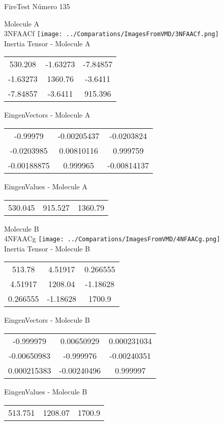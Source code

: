 \vtab[-2cm]
\begin{center}
{\large FireTest \tab Número 135}
\end{center}
\begin{multicols}{2}
\begin{center}

Molecule A \\ 
3NFAACf
\texttt{[image: ../Comparations/ImagesFromVMD/3NFAACf.png]}
\\
Inertia Tensor - Molecule A \\
\vtab

\begin{tabular}{|c c c|}
530.208	 & 	-1.63273	 & 	-7.84857	 \\
-1.63273	 & 	1360.76	 & 	-3.6411	 \\
-7.84857	 & 	-3.6411	 & 	915.396
\end{tabular}

\vtab
 EingenVectors - Molecule A     \\
\vtab
\begin{tabular}{|c c c|}
-0.99979	 & 	-0.00205437	 & 	-0.0203824	 \\
-0.0203985	 & 	0.00810116	 & 	0.999759	 \\
-0.00188875	 & 	0.999965	 & 	-0.00814137
\end{tabular}

\vtab
 EingenValues - Molecule A     \\
\vtab
\begin{tabular}{|c c c|}
530.045	 & 	915.527	 & 	1360.79	 \\
\end{tabular}
\columnbreak

Molecule B \\ 
4NFAACg
\texttt{[image: ../Comparations/ImagesFromVMD/4NFAACg.png]}
\\
Inertia Tensor - Molecule B \\
\vtab

\begin{tabular}{|c c c|}
513.78	 & 	4.51917	 & 	0.266555	 \\
4.51917	 & 	1208.04	 & 	-1.18628	 \\
0.266555	 & 	-1.18628	 & 	1700.9
\end{tabular}

\vtab
 EingenVectors - Molecule B     \\
\vtab
\begin{tabular}{|c c c|}
-0.999979	 & 	0.00650929	 & 	0.000231034	 \\
-0.00650983	 & 	-0.999976	 & 	-0.00240351	 \\
0.000215383	 & 	-0.00240496	 & 	0.999997
\end{tabular}

\vtab
 EingenValues - Molecule B     \\
\vtab
\begin{tabular}{|c c c|}
513.751	 & 	1208.07	 & 	1700.9	 \\
\end{tabular}

\end{center}
\end{multicols}
